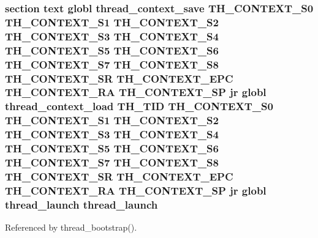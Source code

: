 \hypertarget{mips_2threada_8S_a2b503c377cd1c6226fc07f5eb82e3a6a}{
\subsubsection[{thread\-\_\-launch}]{\setlength{\rightskip}{0pt plus 5cm}section text globl {\bf thread\-\_\-context\-\_\-save} {\bf T\-H\-\_\-\-C\-O\-N\-T\-E\-X\-T\-\_\-\-S0} {\bf T\-H\-\_\-\-C\-O\-N\-T\-E\-X\-T\-\_\-\-S1} {\bf T\-H\-\_\-\-C\-O\-N\-T\-E\-X\-T\-\_\-\-S2} {\bf T\-H\-\_\-\-C\-O\-N\-T\-E\-X\-T\-\_\-\-S3} {\bf T\-H\-\_\-\-C\-O\-N\-T\-E\-X\-T\-\_\-\-S4} {\bf T\-H\-\_\-\-C\-O\-N\-T\-E\-X\-T\-\_\-\-S5} {\bf T\-H\-\_\-\-C\-O\-N\-T\-E\-X\-T\-\_\-\-S6} {\bf T\-H\-\_\-\-C\-O\-N\-T\-E\-X\-T\-\_\-\-S7} {\bf T\-H\-\_\-\-C\-O\-N\-T\-E\-X\-T\-\_\-\-S8} {\bf T\-H\-\_\-\-C\-O\-N\-T\-E\-X\-T\-\_\-\-S\-R} {\bf T\-H\-\_\-\-C\-O\-N\-T\-E\-X\-T\-\_\-\-E\-P\-C} {\bf T\-H\-\_\-\-C\-O\-N\-T\-E\-X\-T\-\_\-\-R\-A} {\bf T\-H\-\_\-\-C\-O\-N\-T\-E\-X\-T\-\_\-\-S\-P} jr globl {\bf thread\-\_\-context\-\_\-load} {\bf T\-H\-\_\-\-T\-I\-D} {\bf T\-H\-\_\-\-C\-O\-N\-T\-E\-X\-T\-\_\-\-S0} {\bf T\-H\-\_\-\-C\-O\-N\-T\-E\-X\-T\-\_\-\-S1} {\bf T\-H\-\_\-\-C\-O\-N\-T\-E\-X\-T\-\_\-\-S2} {\bf T\-H\-\_\-\-C\-O\-N\-T\-E\-X\-T\-\_\-\-S3} {\bf T\-H\-\_\-\-C\-O\-N\-T\-E\-X\-T\-\_\-\-S4} {\bf T\-H\-\_\-\-C\-O\-N\-T\-E\-X\-T\-\_\-\-S5} {\bf T\-H\-\_\-\-C\-O\-N\-T\-E\-X\-T\-\_\-\-S6} {\bf T\-H\-\_\-\-C\-O\-N\-T\-E\-X\-T\-\_\-\-S7} {\bf T\-H\-\_\-\-C\-O\-N\-T\-E\-X\-T\-\_\-\-S8} {\bf T\-H\-\_\-\-C\-O\-N\-T\-E\-X\-T\-\_\-\-S\-R} {\bf T\-H\-\_\-\-C\-O\-N\-T\-E\-X\-T\-\_\-\-E\-P\-C} {\bf T\-H\-\_\-\-C\-O\-N\-T\-E\-X\-T\-\_\-\-R\-A} {\bf T\-H\-\_\-\-C\-O\-N\-T\-E\-X\-T\-\_\-\-S\-P} jr globl thread\-\_\-launch thread\-\_\-launch}}\label{mips_2threada_8S_a2b503c377cd1c6226fc07f5eb82e3a6a}


Referenced by thread\-\_\-bootstrap().

